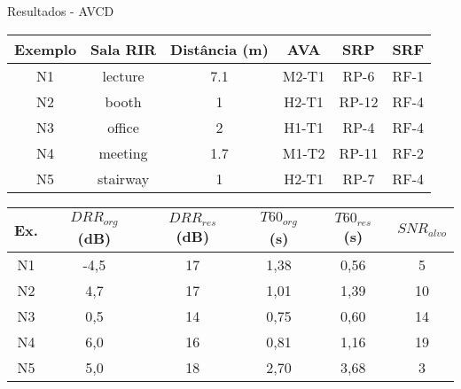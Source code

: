 \begin{frame}{Resultados - AVCD}
    \begin{table} [H]
        \centering
        \begin{tabular}{c|c|c|c|c|c}
    
            \textbf{Exemplo} & 
            \textbf{Sala RIR} & 
            \textbf{Distância (m)} &
            \textbf{AVA} &
            \textbf{SRP} &
            \textbf{SRF} \\
            \hline 
    
            N1 & lecture & 7.1 & M2-T1 & RP-6 & RF-1 \\
            N2 & booth & 1 & H2-T1 & RP-12 & RF-4 \\
            N3 & office & 2 & H1-T1 & RP-4 & RF-4 \\
            N4 & meeting & 1.7 & M1-T2 & RP-11 & RF-2 \\
            N5 & stairway & 1 & H2-T1 & RP-7 & RF-4 \\
    
        \end{tabular}
        \bigbreak
        \bigbreak
        \begin{tabular}{c|c|c|c|c|c}
    
            \textbf{Ex.} & 
            \textbf{$DRR_{org}$ (dB)} & 
            \textbf{$DRR_{res}$ (dB)} & 
            \textbf{$T60_{org}$ (s)} & 
            \textbf{$T60_{res}$ (s)} &
            \textbf{$SNR_{alvo}$} \\
            \hline 
    
            N1 & -4,5 & 17 & 1,38 & 0,56 & 5 \\
            N2 & 4,7 & 17 & 1,01 & 1,39 & 10 \\
            N3 & 0,5 & 14 & 0,75 & 0,60 & 14 \\
            N4 & 6,0 & 16 & 0,81 & 1,16 & 19 \\
            N5 & 5,0 & 18 & 2,70 & 3,68 & 3 \\
    
        \end{tabular}
    \end{table}
\end{frame}

